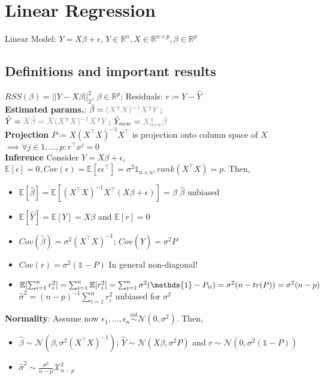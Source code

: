 \section{Linear Regression}
Linear Model: $Y = X\beta + \epsilon$, $Y \in \mathbb{R}^n, X \in \mathbb{R}^{n\times p}, \beta \in \mathbb{R}^p$
\subsection*{Definitions and important results}
$RSS(\beta) = ||Y-X\beta||_2^2$, $\beta \in \mathbb{R}^p$; Residuals: $r \coloneqq Y - \hat{Y}$ \\
\textbf{Estimated params.}: $\hat{\beta} = \mathcolor{gray}{(X^\intercal X)^{-1}X^\intercal Y}$; \\
$\hat{Y} = \mathcolor{gray}{X\hat{\beta} = X(X^\intercal X)^{-1}X^\intercal  Y}$; $\hat{Y}_{new} = \mathcolor{gray}{X_{new}^\intercal \hat{\beta}}$\\
\textbf{Projection} $P \coloneqq X(X^\intercal  X)^{-1}X^\intercal $ is projection onto column space of $X$ $\implies \forall j \in {1,...,p}: r^\intercal x^j = 0$ \\
\textbf{Inference} Consider $Y = X\beta + \epsilon$, $\mathbb{E}[\epsilon]=0, Cov(\epsilon)=\mathbb{E}[\epsilon\epsilon^\intercal ]=\sigma^2\mathds{1}_{n\times n}, rank(X^\intercal X)=p$. Then, \\
\vspace{-0.8\baselineskip}
\begin{itemize}
    \item $\mathbb{E}[\hat\beta] = \mathbb{E}[(X^\intercal X)^{-1}X^\intercal (X\beta + \epsilon)]=\beta$ \textrightarrow $\hat{\beta}$ unbiased
    \item $\mathbb{E}[\hat{Y}] = \mathbb{E}[Y] = X\beta$ and $\mathbb{E}[r] = 0$ 
    \item $Cov(\hat{\beta}) = \sigma^2(X^\intercal X)^{-1}$; $Cov(\hat{Y}) = \sigma^2P$
    \item $Cov(r) = \sigma^2(\mathds{1}-P)$ \textrightarrow In general non-diagonal!
    \item $\mathbb{E}[\sum_{i=1}^n r_i^2] = \sum_{i=1}^n \mathbb{E}[r_i^2] = \sum_{i=1}^n \sigma^2(\mathds{1}-P_{ii}) = \sigma^2(n-tr(P)) = \\ \sigma^2(n-p)$ \textrightarrow $\hat{\sigma}^2 = (n-p)^{-1}\sum_{i=1}^n r_i^2$ unbiased for $\sigma ^2$
\end{itemize}
\textbf{Normality}: Assume now $\epsilon_1,...,\epsilon_n \overset{iid}{\sim} \mathcal{N}(0, \sigma^2)$. Then,
\begin{itemize}
    \item $\hat{\beta} \sim \mathcal{N}(\beta, \sigma^2(X^\intercal X)^{-1})$; $\hat{Y} \sim \mathcal{N}(X\beta, \sigma^2P)$ and $r \sim \mathcal{N}(0,\sigma^2(\mathds{1}-P))$
    \item $\hat{\sigma}^2 \sim \frac{\sigma^2}{n-p}\mathcal{X}_{n-p}^2$
\end{itemize}
